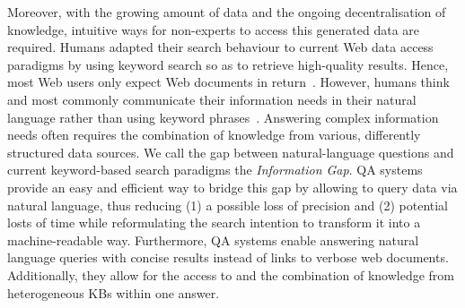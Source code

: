 Moreover, with the growing amount of data and the ongoing decentralisation of knowledge, intuitive ways for non-experts to access this generated data are required. 
Humans adapted their search behaviour to current Web data access paradigms by using keyword search so as to retrieve high-quality results. Hence, most Web users only expect Web documents in return~\cite{ilprints361}.
However, humans think and most commonly communicate their information needs  in their natural language rather than using keyword phrases~\cite{woods1973progress}. 
Answering complex information needs often requires the combination of knowledge from various, differently structured data sources.
We call the gap between natural-language questions and current keyword-based search paradigms the  \emph{Information Gap}.
\ac{QA} systems provide an easy and efficient way to bridge this gap by allowing to query data via natural language, thus reducing (1) a possible loss of precision and (2) potential losts of time while reformulating the search intention to transform it into a machine-readable way.
Furthermore, QA systems enable answering natural language queries with concise results instead of  links to verbose web documents. 
Additionally, they allow for the access  to and the combination of knowledge from heterogeneous \ac{KB}s within one answer.

